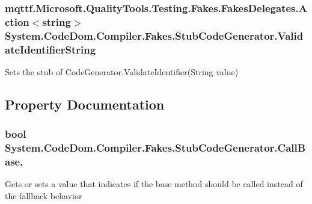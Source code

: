 \hypertarget{class_system_1_1_code_dom_1_1_compiler_1_1_fakes_1_1_stub_code_generator_a95379f74861c55dd79b49be76273d66a}{
\subsubsection[{Validate\-Identifier\-String}]{\setlength{\rightskip}{0pt plus 5cm}mqttf.\-Microsoft.\-Quality\-Tools.\-Testing.\-Fakes.\-Fakes\-Delegates.\-Action$<$string$>$ System.\-Code\-Dom.\-Compiler.\-Fakes.\-Stub\-Code\-Generator.\-Validate\-Identifier\-String}}\label{class_system_1_1_code_dom_1_1_compiler_1_1_fakes_1_1_stub_code_generator_a95379f74861c55dd79b49be76273d66a}


Sets the stub of Code\-Generator.\-Validate\-Identifier(\-String value)



\subsection{Property Documentation}
\hypertarget{class_system_1_1_code_dom_1_1_compiler_1_1_fakes_1_1_stub_code_generator_a15b3a3fe994256b553266bb29012df44}{
\subsubsection[{Call\-Base}]{\setlength{\rightskip}{0pt plus 5cm}bool System.\-Code\-Dom.\-Compiler.\-Fakes.\-Stub\-Code\-Generator.\-Call\-Base\hspace{0.3cm}{\ttfamily [get]}, {\ttfamily [set]}}}\label{class_system_1_1_code_dom_1_1_compiler_1_1_fakes_1_1_stub_code_generator_a15b3a3fe994256b553266bb29012df44}


Gets or sets a value that indicates if the base method should be called instead of the fallback behavior

